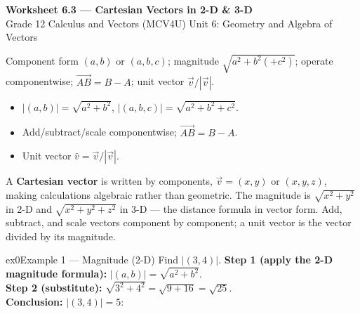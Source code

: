 \documentclass[11pt]{article}
\begin{document}
\begin{center}
{\LARGE\bfseries\color{titleblue}Worksheet 6.3 --- Cartesian Vectors in 2-D \& 3-D}\\[2pt]
{\small Grade 12 Calculus and Vectors (MCV4U) \textperiodcentered{} Unit 6: Geometry and Algebra of Vectors}
\end{center}

\begin{ideabox}
Component form $(a,b)$ or $(a,b,c)$; magnitude $\sqrt{a^2+b^2(+c^2)}$; operate componentwise; $\vec{AB}=B-A$; unit vector $\vec v/|\vec v|$.
\begin{itemize}[leftmargin=*,itemsep=2pt]
  \item $|(a,b)|=\sqrt{a^2+b^2}$, $|(a,b,c)|=\sqrt{a^2+b^2+c^2}$.
  \item Add/subtract/scale componentwise; $\vec{AB}=B-A$.
  \item Unit vector $\hat v=\vec v/|\vec v|$.
\end{itemize}
\end{ideabox}

\begin{learnbox}
A \textbf{Cartesian vector} is written by components, $\vec v=(x,y)$ or $(x,y,z)$, making calculations algebraic rather than geometric.
The magnitude is $\sqrt{x^2+y^2}$ in 2-D and $\sqrt{x^2+y^2+z^2}$ in 3-D — the distance formula in vector form.
Add, subtract, and scale vectors component by component; a unit vector is the vector divided by its magnitude.
\end{learnbox}


\begin{example}{ex0}{Example 1 --- Magnitude (2-D)}
Find $|(3,4)|$.\soln
\textbf{Step 1 (apply the 2-D magnitude formula):} $|(a,b)|=\sqrt{a^2+b^2}$.\\[3pt]
\textbf{Step 2 (substitute):} $\sqrt{3^2+4^2}=\sqrt{9+16}=\sqrt{25}$.\\[3pt]
\textbf{Conclusion:} $|(3,4)|=5$:\begin{center}\end{center}
\end{example}
\end{document}
